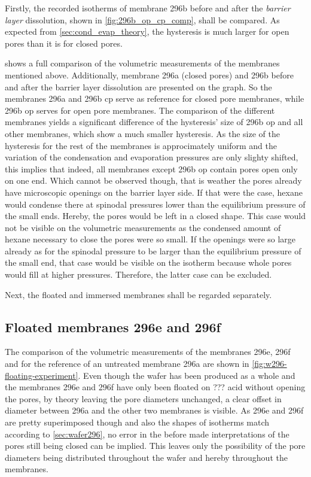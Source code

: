 \documentclass[thesis.tex]{subfiles}
\begin{document}
        Firstly, the recorded isotherms of membrane 296b before and after the \textit{barrier layer} dissolution, shown in \cref{fig:296b_op_cp_comp}, shall be compared. As expected from \cref{sec:cond_evap_theory}, the hysteresis is much larger for open pores than it is for closed pores.
        \medskip

         shows a full comparison of the volumetric measurements of the membranes mentioned above. Additionally, membrane 296a (closed pores) and 296b before and after the barrier layer dissolution are presented on the graph. So the membranes 296a and 296b cp serve as reference for closed pore membranes, while 296b op serves for open pore membranes. The comparison of the different membranes yields a significant difference of the hysteresis' size of 296b op and all other membranes, which show a much smaller hysteresis. As the size of the hysteresis for the rest of the membranes is approcimately uniform and the variation of the condensation and evaporation pressures are only slighty shifted, this implies that indeed, all membranes except 296b op contain pores open only on one end. Which cannot be observed though, that is weather the pores already have microscopic openings on the barrier layer side. If that were the case, hexane would condense there at spinodal pressures lower than the equilibrium pressure of the small ends. Hereby, the pores would be left in a closed shape. This case would not be visible on the volumetric measurements as the condensed amount of hexane necessary to close the pores were so small. If the openings were so large already as for the spinodal pressure to be larger than the equilibrium pressure of the small end, that case would be visible on the isotherm because whole pores would fill at higher pressures. Therefore, the latter case can be excluded.

        Next, the floated and immersed membranes shall be regarded separately.

        


      \subsection{Floated membranes 296e and 296f}
      \label{subsec:floated-membranes}

          The comparison of the volumetric measurements of the membranes 296e, 296f and for the reference of an untreated membrane 296a are shown in \cref{fig:w296-floating-experiment}. Even though the wafer has been produced as a whole and the membranes 296e and 296f have only been floated on ??? acid without opening the pores, by theory leaving the pore diameters unchanged, a clear offset in diameter between 296a and the other two membranes is visible. As 296e and 296f are pretty superimposed though and also the shapes of isotherms match according to \cref{sec:wafer296}, no error in the before made interpretations of the pores still being closed can be implied. This leaves only the possibility of the pore diameters being distributed throughout the wafer and hereby throughout the membranes.
\end{document}
